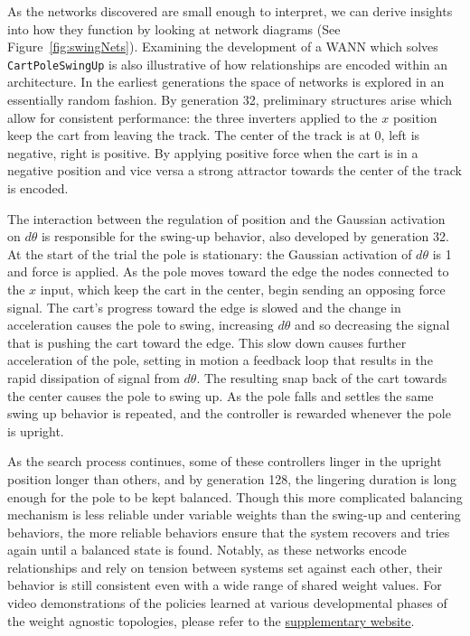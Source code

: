 As the networks discovered are small enough to interpret, we can derive insights into how they function by looking at network diagrams (See Figure~\ref{fig:swingNets}).
%
Examining the development of a WANN which solves \texttt{CartPoleSwingUp} is also illustrative of how relationships are encoded within an architecture. 
%
In the earliest generations the space of networks is explored in an essentially random fashion.
%
By generation 32, preliminary structures arise which allow for consistent performance: the three inverters applied to the $x$ position keep the cart from leaving the track. The center of the track is at $0$, left is negative, right is positive. 
%
By applying positive force when the cart is in a negative position and vice versa a strong attractor towards the center of the track is encoded.
%

The interaction between the regulation of position and the Gaussian activation on $d\theta$ is responsible for the swing-up behavior, also developed by generation 32. 
%
At the start of the trial the pole is stationary: the Gaussian activation of $d\theta$ is 1 and force is applied. 
%
As the pole moves toward the edge the nodes connected to the $x$ input, which keep the cart in the center, begin sending an opposing force signal.
%
The cart's progress toward the edge is slowed and the change in acceleration causes the pole to swing, increasing $d\theta$ and so decreasing the signal that is pushing the cart toward the edge.
%
This slow down causes further acceleration of the pole, setting in motion a feedback loop that results in the rapid dissipation of signal from $d\theta$.
%
The resulting snap back of the cart towards the center causes the pole to swing up.
%
As the pole falls and settles the same swing up behavior is repeated, and the controller is rewarded whenever the pole is upright.


As the search process continues, some of these controllers linger in the upright position longer than others, and by generation 128, the lingering duration is long enough for the pole to be kept balanced.
%
Though this more complicated balancing mechanism is less reliable under variable weights than the swing-up and centering behaviors, the more reliable behaviors ensure that the system recovers and tries again until a balanced state is found. %
%
Notably, as these networks encode relationships and rely on tension between systems set against each other, their behavior is still consistent even with a wide range of shared weight values.
For video demonstrations of the policies learned at various developmental phases of the weight agnostic topologies, please refer to the \href{\websiteurl}{supplementary website}.

